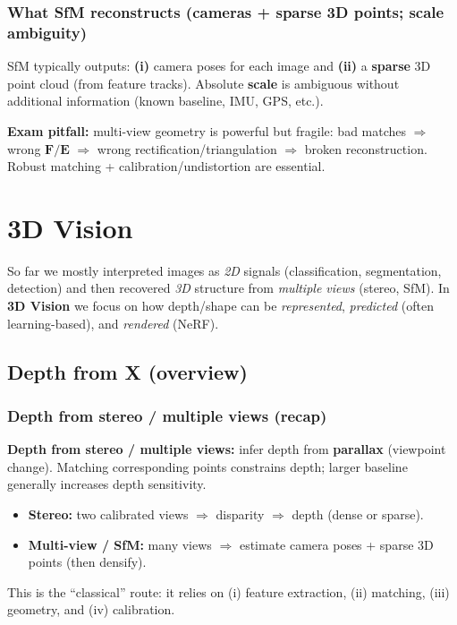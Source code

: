 \documentclass[11pt,a4paper]{article}
\newcommand{\mat}[1]{\mathbf{#1}}
\begin{document}
\subsubsection{What SfM reconstructs (cameras + sparse 3D points; scale ambiguity)}

\begin{intbox}
SfM typically outputs:
\textbf{(i)} camera poses for each image and
\textbf{(ii)} a \textbf{sparse} 3D point cloud (from feature tracks).
Absolute \textbf{scale} is ambiguous without additional information (known baseline, IMU, GPS, etc.).
\end{intbox}

\begin{qbox}
\textbf{Exam pitfall:} multi-view geometry is powerful but fragile:
bad matches $\Rightarrow$ wrong $\mat{F}/\mat{E}$ $\Rightarrow$ wrong rectification/triangulation $\Rightarrow$ broken reconstruction.
Robust matching + calibration/undistortion are essential.
\end{qbox}

\section{3D Vision}

\begin{intbox}
So far we mostly interpreted images as \emph{2D} signals (classification, segmentation, detection) and then recovered
\emph{3D} structure from \emph{multiple views} (stereo, SfM). In \textbf{3D Vision} we focus on how depth/shape can be
\emph{represented}, \emph{predicted} (often learning-based), and \emph{rendered} (NeRF).
\end{intbox}

\subsection{Depth from X (overview)}

\subsubsection{Depth from stereo / multiple views (recap)}
\begin{defbox}
\textbf{Depth from stereo / multiple views:} infer depth from \textbf{parallax} (viewpoint change).
Matching corresponding points constrains depth; larger baseline generally increases depth sensitivity.
\end{defbox}
\begin{itemize}
  \item \textbf{Stereo:} two calibrated views $\Rightarrow$ disparity $\Rightarrow$ depth (dense or sparse).
  \item \textbf{Multi-view / SfM:} many views $\Rightarrow$ estimate camera poses + sparse 3D points (then densify).
\end{itemize}
\begin{notebox}
This is the ``classical'' route: it relies on (i) feature extraction, (ii) matching, (iii) geometry, and (iv) calibration.
\end{notebox}
\end{document}
